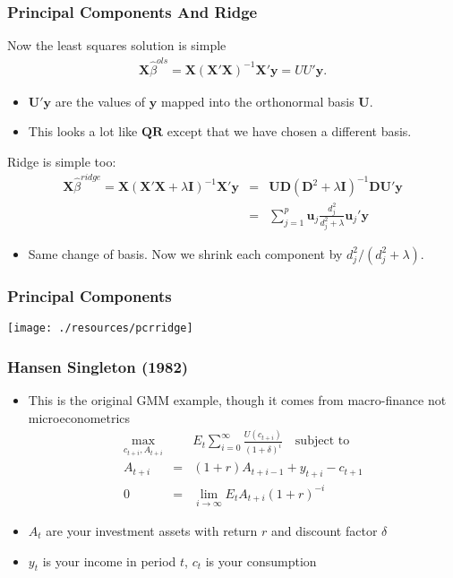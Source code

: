 \documentclass[xcolor=pdftex,dvipsnames,table,mathserif,aspectratio=169]{beamer}
\begin{document}
\begin{frame}
\frametitle{Principal Components And Ridge}
Now the least squares solution is simple
\begin{eqnarray*}
\mathbf{X} \hat{\beta}^{ols} = \mathbf{X} (\mathbf{X}'\mathbf{X})^{-1} \mathbf{X}' \mathbf{y} = U U' \mathbf{y}.
\end{eqnarray*}
\begin{itemize}
\item $\mathbf{U}' \mathbf{y}$ are the values of $\mathbf{y}$ mapped into the orthonormal basis $\mathbf{U}$.
\item This looks a lot like $\mathbf{QR}$ except that we have chosen a different basis.
\end{itemize}
Ridge is simple too:
\begin{eqnarray*}
\mathbf{X} \hat{\beta}^{ridge} = \mathbf{X} (\mathbf{X}'\mathbf{X} + \lambda \mathbf{I})^{-1} \mathbf{X}' \mathbf{y} &=& \mathbf{U D} (\mathbf{D}^2 + \lambda \mathbf{I})^{-1} \mathbf{D} \mathbf{U}' \mathbf{y}\\
&=& \sum_{j=1}^p \mathbf{u}_j  \frac{d_j^2}{d_j^2 + \lambda} \mathbf{u}_j' \mathbf{y}
\end{eqnarray*}
\begin{itemize}
\item Same change of basis. Now we shrink each component by $d_j^2/(d_j^2 + \lambda)$.
\end{itemize}
\end{frame}



\begin{frame}
\frametitle{Principal Components}
\begin{center}
\texttt{[image: ./resources/pcrridge]}
\end{center}
\end{frame}



\begin{frame}
\frametitle{Hansen Singleton (1982)}
\begin{itemize}
\item This is the original GMM example, though it comes from macro-finance not microeconometrics
\begin{eqnarray*}
\max_{c_{t+i},A_{t+i}}&& E_t \sum_{i=0}^{\infty} \frac{U(c_{t+i})}{(1+\delta)^i} \quad \mbox{subject to } \\
A_{t+i} &=& (1+r) A_{t+i-1} + y_{t+i} - c_{t+1} \\
0&=&\lim_{i \rightarrow \infty} E_t A_{t+i} (1+r)^{-i} 
\end{eqnarray*}
\item $A_t$ are your investment assets with return $r$ and discount factor $\delta$
\item $y_t$ is your income in period $t$, $c_t$ is your consumption 
\end{itemize}
\end{frame}
\end{document}
